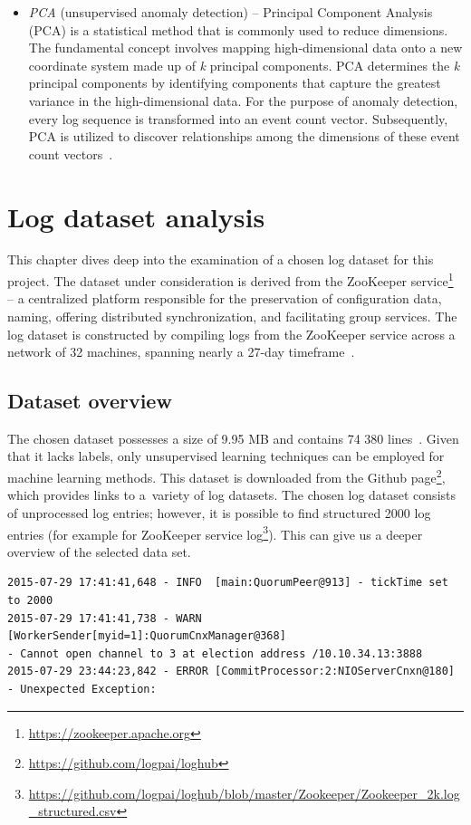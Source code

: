 \begin{itemize}
    \item \emph{PCA} (unsupervised anomaly detection) \--- Principal Component Analysis (PCA) is a statistical method that is commonly used to reduce dimensions. The fundamental concept involves mapping high-dimensional data onto a new coordinate system made up of \emph{k} principal components. PCA determines the \emph{k} principal components by identifying components that capture the greatest variance in the high-dimensional data. For the purpose of anomaly detection, every log sequence is transformed into an event count vector. Subsequently, PCA is utilized to discover relationships among the dimensions of these event count vectors~\cite{he2016expreport}.
\end{itemize}


\chapter{Log dataset analysis}
\label{chap:analysis}
This chapter dives deep into the examination of a chosen log dataset for this project. The dataset under consideration is derived from the ZooKeeper service\footnote{\url{https://zookeeper.apache.org}} \--- a centralized platform responsible for the preservation of configuration data, naming, offering distributed synchronization, and facilitating group services. The log dataset is constructed by compiling logs from the ZooKeeper service across a network of 32 machines, spanning nearly a 27-day timeframe~\cite{zhu2023loghub}.

\section{Dataset overview}
\label{sec:overview}
The chosen dataset possesses a size of 9.95 MB and contains 74 380 lines~\cite{zhu2023loghub}. Given that it lacks labels, only unsupervised learning techniques can be employed for machine learning methods. This dataset is downloaded from the Github page\footnote{\url{https://github.com/logpai/loghub}}, which provides links to a~variety of log datasets. The chosen log dataset consists of unprocessed log entries; however, it is possible to find structured 2000 log entries (for example for ZooKeeper service log\footnote{\url{https://github.com/logpai/loghub/blob/master/Zookeeper/Zookeeper_2k.log_structured.csv}}). This can give us a deeper overview of the selected data set.

\begin{lstlisting}
2015-07-29 17:41:41,648 - INFO  [main:QuorumPeer@913] - tickTime set to 2000
2015-07-29 17:41:41,738 - WARN [WorkerSender[myid=1]:QuorumCnxManager@368]
- Cannot open channel to 3 at election address /10.10.34.13:3888
2015-07-29 23:44:23,842 - ERROR [CommitProcessor:2:NIOServerCnxn@180]
- Unexpected Exception:
\end{lstlisting}


